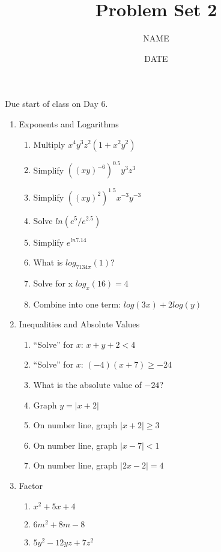 \documentclass[12pt,thmsa]{article}
\title{Problem Set 2}
\author{NAME}
\date{DATE}
\begin{document}
\maketitle

Due start of class on Day 6. 

\begin{enumerate}
    \item Exponents and Logarithms
        \begin{enumerate}
            \item Multiply $x^4 y^3 z^2 (1 + x^2 y^2)$
            \item Simplify $((xy)^{-6})^{0.5} y^3z^{3}$
            \item Simplify $((xy)^2)^{1.5} x^{-3}y^{-3}$
            \item Solve $ln(e^5/e^{2.5})$
            \item Simplify $e^{ln 7.14}$
            \item What is $log_{7134\pi}(1)$?
            \item Solve for x $log_x(16)=4$ %
            \item Combine into one term: $log(3x)+2log(y)$ %
        \end{enumerate}

    \item Inequalities and Absolute Values
        \begin{enumerate}
            \item ``Solve'' for $x$: $x + y +2 < 4$
            \item ``Solve'' for $x$: $(-4)(x + 7) \geq -24$
            \item What is the absolute value of $-24$?
            \item Graph $y = |x +2|$
            \item On number line, graph $|x + 2| \geq 3$
            \item On number line, graph $|x - 7| < 1$
            \item On number line, graph $|2x - 2| = 4$
        \end{enumerate}

    \item Factor
        \begin{enumerate}
            \item $x^2+ 5x+4$
            \item $6m^2+8m-8$ 
            \item $5y^2-12yz+7z^2$ 
        \end{enumerate}


\end{enumerate}
\end{document}
